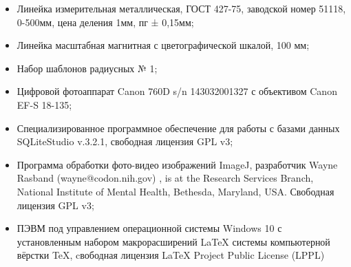 \begin{itemize}
	\item  Линейка измерительная металлическая, ГОСТ 427-75, заводской номер 51118, 0-500мм, цена деления 1мм, пг ± 0,15мм;
	\item  Линейка масштабная магнитная с цветографической шкалой, 100 мм;
	\item  Набор шаблонов радиусных № 1;
	\item  Цифровой фотоаппарат  Canon 760D s/n 143032001327  с объективом Canon EF-S 18-135;
%	
    \item  Специализированное программное обеспечение для работы с базами данных  SQLiteStudio v.3.2.1, свободная лицензия GPL v3;
    
	\item  Программа обработки фото-видео изображений ImageJ, разработчик  Wayne Rasband (wayne@codon.nih.gov) , is at the Research Services Branch, National Institute of Mental Health, Bethesda, Maryland, USA. Свободная лицензия GPL v3;
	\item  ПЭВМ под управлением операционной системы Windows 10 с установленным набором макрорасширений LaTeX системы компьютерной вёрстки TeX, cвободная лицензия LaTeX Project Public License (LPPL)
\end{itemize}
